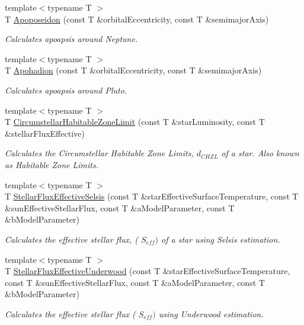 \begin{DoxyCompactItemize}
{\footnotesize template$<$typename T $>$ }\\T \hyperlink{group___apoapsis_ga89679654fff13176e989536163a27f9d}{Apoposeidon} (const T \&orbital\+Eccentricity, const T \&semimajor\+Axis)
\begin{DoxyCompactList}\small\item\em Calculates apoapsis around Neptune. \end{DoxyCompactList}\item 
{\footnotesize template$<$typename T $>$ }\\T \hyperlink{group___apoapsis_gaa16847ddc5763c327067075dcb6a3353}{Apohadion} (const T \&orbital\+Eccentricity, const T \&semimajor\+Axis)
\begin{DoxyCompactList}\small\item\em Calculates apoapsis around Pluto. \end{DoxyCompactList}\item 
{\footnotesize template$<$typename T $>$ }\\T \hyperlink{group___astrophysics_ga23a8f602461ea3257e8767b1d455c383}{Circumstellar\+Habitable\+Zone\+Limit} (const T \&star\+Luminosity, const T \&stellar\+Flux\+Effective)
\begin{DoxyCompactList}\small\item\em Calculates the Circumstellar Habitable Zone Limits, $d_{CHZL}$ of a star. Also known as Habitable Zone Limits. \end{DoxyCompactList}\item 
{\footnotesize template$<$typename T $>$ }\\T \hyperlink{group___astrophysics_ga3ce3a04fec7b1c8fb66ac54270ce3902}{Stellar\+Flux\+Effective\+Selsis} (const T \&star\+Effective\+Surface\+Temperature, const T \&sun\+Effective\+Stellar\+Flux, const T \&a\+Model\+Parameter, const T \&b\+Model\+Parameter)
\begin{DoxyCompactList}\small\item\em Calculates the effective stellar flux, ( $S_{eff})$ of a star using Selsis estimation. \end{DoxyCompactList}\item 
{\footnotesize template$<$typename T $>$ }\\T \hyperlink{group___astrophysics_ga34d1e39bce17904bc6d383f1935c79d6}{Stellar\+Flux\+Effective\+Underwood} (const T \&star\+Effective\+Surface\+Temperature, const T \&sun\+Effective\+Stellar\+Flux, const T \&a\+Model\+Parameter, const T \&b\+Model\+Parameter)
\begin{DoxyCompactList}\small\item\em Calculates the effective stellar flux ( $S_{eff})$ using Underwood estimation. \end{DoxyCompactList}\item 

\end{DoxyCompactItemize}
